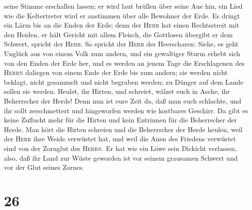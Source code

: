 seine Stimme erschallen lassen; er wird laut brüllen über seine Aue hin,
ein Lied wie die Keltertreter wird er anstimmen über alle Bewohner der
Erde.  Es dringt ein Lärm bis an die Enden der Erde; denn
der \textsc{Herr} hat einen Rechtsstreit mit den Heiden, er hält Gericht
mit allem Fleisch, die Gottlosen übergibt er dem Schwert, spricht der
\textsc{Herr}.  So spricht der \textsc{Herr} der
Heerscharen: Siehe, es geht Unglück aus von einem Volk zum andern, und
ein gewaltiger Sturm erhebt sich von den Enden der Erde her,
 und es werden an jenem Tage die Erschlagenen des
\textsc{Herrn} daliegen von einem Ende der Erde bis zum andern; sie
werden nicht beklagt, nicht gesammelt und nicht begraben werden; zu
Dünger auf dem Lande sollen sie werden.  Heulet, ihr
Hirten, und schreiet, wälzet euch in Asche, ihr Beherrscher der Herde!
Denn nun ist eure Zeit da, daß man euch schlachte, und ihr sollt
zerschmettert und hingeworfen werden wie kostbares Geschirr.
 Da gibt es keine Zuflucht mehr für die Hirten und kein
Entrinnen für die Beherrscher der Herde.  Man hört die
Hirten schreien und die Beherrscher der Herde heulen, weil der
\textsc{Herr} ihre Weide verwüstet hat,  und weil die
Auen des Friedens verwüstet sind von der Zornglut des \textsc{Herrn}.
 Er hat wie ein Löwe sein Dickicht verlassen, also, daß
ihr Land zur Wüste geworden ist vor seinem grausamen Schwert und vor der
Glut seines Zornes.

\hypertarget{section-25}{%
\section{26}\label{section-25}}

